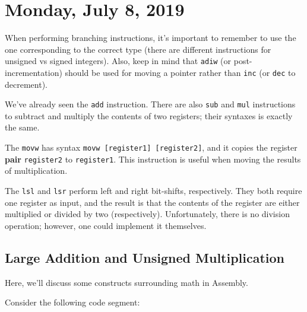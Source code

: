 \section{Monday, July 8, 2019}
When performing branching instructions, it's important to remember to use the one corresponding to the correct type (there are different instructions for unsigned vs signed integers). Also, keep in mind that \verb!adiw! (or post-incrementation) should be used for moving a pointer rather than \verb!inc! (or \verb!dec! to decrement). 

We've already seen the \verb!add! instruction. There are also \verb!sub! and \verb!mul! instructions to subtract and multiply the contents of two registers; their syntaxes is exactly the same. 

The \verb!movw! has syntax \verb!movw [register1] [register2]!, and it copies the register \textbf{pair} \verb!register2! to \verb!register1!. This instruction is useful when moving the results of multiplication. 

The \verb!lsl! and \verb!lsr! perform left and right bit-shifts, respectively. They both require one register as input, and the result is that the contents of the register are either multiplied or divided by two (respectively). Unfortunately, there is no division operation; however, one could implement it themselves.

\subsection{Large Addition and Unsigned Multiplication}
Here, we'll discuss some constructs surrounding math in Assembly.

Consider the following code segment:


